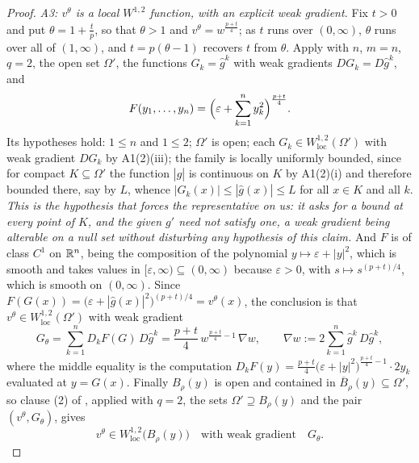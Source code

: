 \begin{proof}
\emph{A3: $v^\theta$ is a local $W^{1,2}$ function, with an explicit weak
gradient.}  Fix $t>0$ and put $\theta=1+\frac tp$, so that $\theta>1$ and
$v^\theta=w^{\frac{p+t}4}$; as $t$ runs over $(0,\infty)$, $\theta$ runs over all
of $(1,\infty)$, and $t=p(\theta-1)$ recovers $t$ from $\theta$.  Apply
 with $n$, $m=n$, $q=2$, the open set $\Omega'$,
the functions $G_k=\hat g^k$ with weak gradients $DG_k=D\hat g^k$, and
\[
F(y_1,\dots,y_n)=\Bigl(\varepsilon+\sum_{k=1}^ny_k^2\Bigr)^{\frac{p+t}4}.
\]
Its hypotheses hold: $1\le n$ and $1\le 2$; $\Omega'$ is open; each
$G_k\in W^{1,2}_{\mathrm{loc}}(\Omega')$ with weak gradient $DG_k$ by
A1(2)(iii); the family is locally uniformly bounded, since for compact
$K\subseteq\Omega'$ the function $|\hat g|$ is continuous on $K$ by A1(2)(i) and
therefore bounded there, say by $L$, whence $|G_k(x)|\le|\hat g(x)|\le L$ for
all $x\in K$ and all $k$.  \emph{This is the hypothesis that forces the
representative on us: it asks for a bound at \emph{every} point of $K$, and the
given $g'$ need not satisfy one, a weak gradient being alterable on a null set
without disturbing any hypothesis of this claim.}  And $F$ is of
class $C^1$ on $\mathbb{R}^n$, being the composition of the polynomial
$y\mapsto\varepsilon+|y|^2$, which is smooth and takes values in
$[\varepsilon,\infty)\subseteq(0,\infty)$ because $\varepsilon>0$, with
$s\mapsto s^{(p+t)/4}$, which is smooth on $(0,\infty)$.  Since
$F(G(x))=\bigl(\varepsilon+|\hat g(x)|^2\bigr)^{(p+t)/4}=v^\theta(x)$, the conclusion
is that $v^\theta\in W^{1,2}_{\mathrm{loc}}(\Omega')$ with weak gradient
\[
G_\theta=\sum_{k=1}^nD_kF(G)\,D\hat g^k
=\frac{p+t}4\,w^{\frac{p+t}4-1}\,\nabla w,
\qquad
\nabla w:=2\sum_{k=1}^n\hat g^k\,D\hat g^k ,
\]
where the middle equality is the computation
$D_kF(y)=\frac{p+t}4\bigl(\varepsilon+|y|^2\bigr)^{\frac{p+t}4-1}\cdot2y_k$
evaluated at $y=G(x)$.  Finally $B_\rho(y)$ is open and contained in
$\overline B_\rho(y)\subseteq\Omega'$, so clause (2) of
, applied with $q=2$, the sets
$\Omega'\supseteq B_\rho(y)$ and the pair $(v^\theta,G_\theta)$, gives
\[
v^\theta\in W^{1,2}_{\mathrm{loc}}\bigl(B_\rho(y)\bigr)
\quad\text{with weak gradient}\quad G_\theta .
\tag{A3}
\]


\end{proof}
